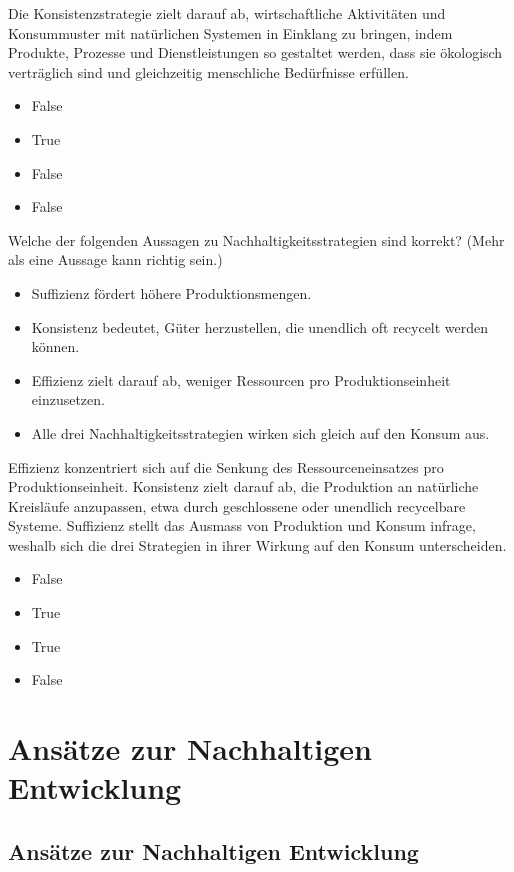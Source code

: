 \documentclass[
  nswissgerman,
  a4paper,
  DIV=11,
  numbers=noendperiod,
  oneside,
  openany]{scrreprt}
\providecommand{\tightlist}{%
  \setlength{\itemsep}{0pt}\setlength{\parskip}{0pt}}
\begin{document}
Die Konsistenzstrategie zielt darauf ab, wirtschaftliche Aktivitäten und
Konsummuster mit natürlichen Systemen in Einklang zu bringen, indem
Produkte, Prozesse und Dienstleistungen so gestaltet werden, dass sie
ökologisch verträglich sind und gleichzeitig menschliche Bedürfnisse
erfüllen.

\begin{itemize}
\tightlist
\item
  False
\item
  True
\item
  False
\item
  False
\end{itemize}

Welche der folgenden Aussagen zu Nachhaltigkeitsstrategien sind korrekt?
(Mehr als eine Aussage kann richtig sein.)

\begin{itemize}
\tightlist
\item[$\square$]
  Suffizienz fördert höhere Produktionsmengen.
\item[$\square$]
  Konsistenz bedeutet, Güter herzustellen, die unendlich oft recycelt
  werden können.
\item[$\square$]
  Effizienz zielt darauf ab, weniger Ressourcen pro Produktionseinheit
  einzusetzen.
\item[$\square$]
  Alle drei Nachhaltigkeitsstrategien wirken sich gleich auf den Konsum
  aus.
\end{itemize}

Effizienz konzentriert sich auf die Senkung des Ressourceneinsatzes pro
Produktionseinheit. Konsistenz zielt darauf ab, die Produktion an
natürliche Kreisläufe anzupassen, etwa durch geschlossene oder unendlich
recycelbare Systeme. Suffizienz stellt das Ausmass von Produktion und
Konsum infrage, weshalb sich die drei Strategien in ihrer Wirkung auf
den Konsum unterscheiden.

\begin{itemize}
\tightlist
\item
  False
\item
  True
\item
  True
\item
  False
\end{itemize}

\part{Ansätze zur Nachhaltigen Entwicklung}

\chapter{Ansätze zur Nachhaltigen
Entwicklung}\label{ansuxe4tze-zur-nachhaltigen-entwicklung-1}
\end{document}
